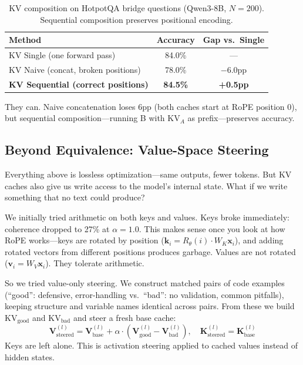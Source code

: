 \documentclass{article}
\begin{document}
\begin{table}[t]
\centering
\caption{KV composition on HotpotQA bridge questions (Qwen3-8B, $N{=}200$). Sequential composition preserves positional encoding.}
\label{tab:composition}
\begin{tabular}{lcc}
\toprule
\textbf{Method} & \textbf{Accuracy} & \textbf{Gap vs.\ Single} \\
\midrule
KV Single (one forward pass) & 84.0\% & --- \\
KV Naive (concat, broken positions) & 78.0\% & $-$6.0pp \\
\textbf{KV Sequential (correct positions)} & \textbf{84.5\%} & \textbf{+0.5pp} \\
\bottomrule
\end{tabular}
\end{table}

They can. Naive concatenation loses 6pp (both caches start at RoPE position 0), but sequential composition---running B with $\text{KV}_A$ as prefix---preserves accuracy.

\subsection{Beyond Equivalence: Value-Space Steering}
\label{sec:steering}

Everything above is lossless optimization---same outputs, fewer tokens. But KV caches also give us write access to the model's internal state. What if we write something that no text could produce?

We initially tried arithmetic on both keys and values. Keys broke immediately: coherence dropped to 27\% at $\alpha{=}1.0$. This makes sense once you look at how RoPE \citep{su2024roformer} works---keys are rotated by position ($\mathbf{k}_i = R_{\theta}(i) \cdot W_K \mathbf{x}_i$), and adding rotated vectors from different positions produces garbage. Values are not rotated ($\mathbf{v}_i = W_V \mathbf{x}_i$). They tolerate arithmetic.

So we tried value-only steering. We construct matched pairs of code examples (``good'': defensive, error-handling vs.\ ``bad'': no validation, common pitfalls), keeping structure and variable names identical across pairs. From these we build $\text{KV}_{\text{good}}$ and $\text{KV}_{\text{bad}}$ and steer a fresh base cache:
\begin{equation}
    \mathbf{V}^{(l)}_{\text{steered}} = \mathbf{V}^{(l)}_{\text{base}} + \alpha \cdot (\mathbf{V}^{(l)}_{\text{good}} - \mathbf{V}^{(l)}_{\text{bad}}), \quad \mathbf{K}^{(l)}_{\text{steered}} = \mathbf{K}^{(l)}_{\text{base}}
\end{equation}
Keys are left alone. This is activation steering \citep{turner2023activation, li2024inference} applied to cached values instead of hidden states.
\end{document}

